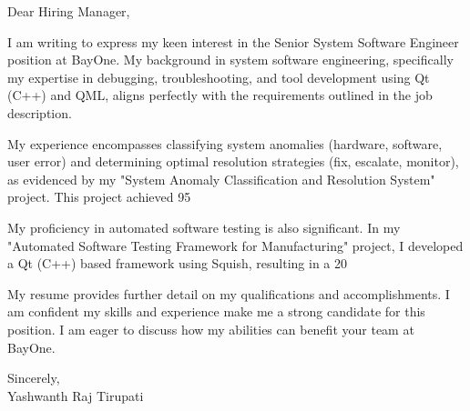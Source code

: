 \documentclass[letterpaper,11pt]{article}
\begin{document}
\begin{flushleft}
Dear Hiring Manager,

\vspace{12pt}

I am writing to express my keen interest in the Senior System Software Engineer position at BayOne.  My background in system software engineering, specifically my expertise in debugging, troubleshooting, and tool development using Qt (C++) and QML, aligns perfectly with the requirements outlined in the job description.

\vspace{12pt}

My experience encompasses classifying system anomalies (hardware, software, user error) and determining optimal resolution strategies (fix, escalate, monitor), as evidenced by my "System Anomaly Classification and Resolution System" project. This project achieved 95%

\vspace{12pt}

My proficiency in automated software testing is also significant.  In my "Automated Software Testing Framework for Manufacturing" project, I developed a Qt (C++) based framework using Squish, resulting in a 20%

\vspace{12pt}

My resume provides further detail on my qualifications and accomplishments. I am confident my skills and experience make me a strong candidate for this position. I am eager to discuss how my abilities can benefit your team at BayOne.

\vspace{20pt}

Sincerely, \\
Yashwanth Raj Tirupati

\end{flushleft}
\end{document}
